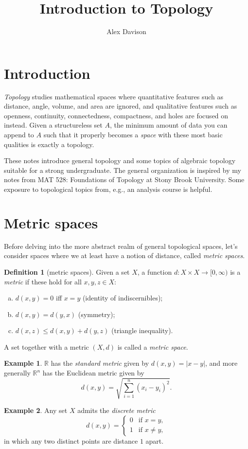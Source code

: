 \documentclass[11pt]{article}
\title{\textbf{Introduction to Topology}}
\author{Alex Davison}
\theoremstyle{definition}
\newtheorem{definition}{Definition}[section]
\newtheorem{example}{Example}[section]
\theoremstyle{remark}
\begin{document}
\maketitle

\tableofcontents

\section{Introduction}

\emph{Topology} studies mathematical spaces where quantitative features such as distance, angle, volume, and area are ignored, and qualitative features such as openness, continuity, connectedness, compactness, and holes are focused on instead. Given a structureless set $A$, the minimum amount of data you can append to $A$ such that it properly becomes a \emph{space} with these most basic qualities is exactly a topology.

These notes introduce general topology and some topics of algebraic topology suitable for a strong undergraduate. The general organization is inspired by my notes from MAT 528: Foundations of Topology at Stony Brook University. Some exposure to topological topics from, e.g., an analysis course is helpful.

\section{Metric spaces}

Before delving into the more abstract realm of general topological spaces, let's consider spaces where we at least have a notion of distance, called \emph{metric spaces}.

\begin{definition}[metric spaces]
    Given a set $X$, a function $d : X \times X \to [0,\infty)$ is a \emph{metric} if these hold for all $x, y, z \in X$:
    \begin{enumerate}[(a)]
        \item $d(x, y) = 0$ iff $x = y$ (identity of indiscernibles);
        \item $d(x, y) = d(y, x)$ (symmetry);
        \item $d(x, z) \leq d(x, y) + d(y, z)$ (triangle inequality).
    \end{enumerate}
    A set together with a metric $(X, d)$ is called a \emph{metric space}.
\end{definition}

\begin{example}
    $\mathbb{R}$ has the \emph{standard metric} given by $d(x, y) = |x - y|$, and more generally $\mathbb{R}^n$ has the Euclidean metric given by
    \[
        d(x, y) = \sqrt{\sum_{i = 1}^n (x_i - y_i)^2}.
    \]
\end{example}
\begin{example}
    Any set $X$ admits the \emph{discrete metric}
    \[
    d(x, y) =
    \begin{cases}
        0 & \text{if } x = y, \\
        1 & \text{if } x \neq y,
    \end{cases}
    \]
    in which any two distinct points are distance $1$ apart.
\end{example}
\end{document}
